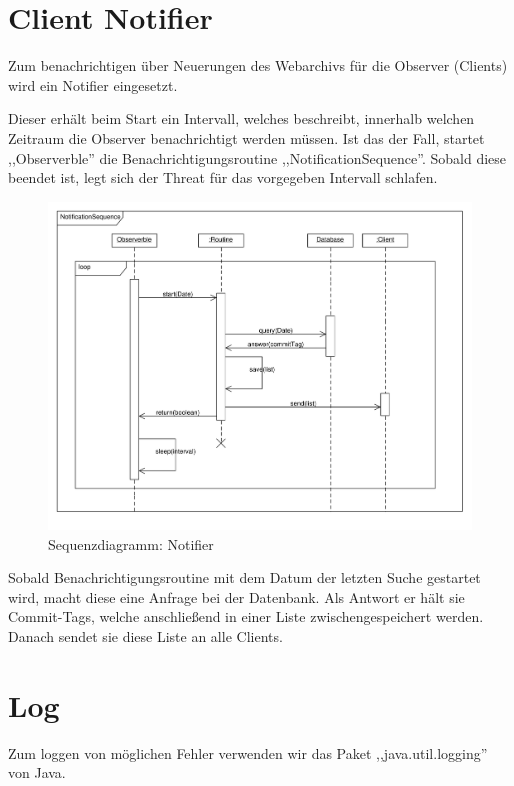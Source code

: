 \section {Client Notifier}
Zum benachrichtigen über Neuerungen des Webarchivs für die Observer (Clients) wird ein Notifier eingesetzt.

Dieser erhält beim Start ein Intervall, welches beschreibt, innerhalb welchen Zeitraum die Observer  benachrichtigt werden müssen. 
Ist das der Fall, startet ,,Observerble'' die Benachrichtigungsroutine  ,,NotificationSequence''.
Sobald diese beendet ist, legt sich der Threat  für das vorgegeben Intervall schlafen.

\begin{figure}[H]
	\centering
	\includegraphics[width=\textwidth]{design/frontend/sequence/notifySequence.pdf}
	\caption{Sequenzdiagramm: Notifier}
\end{figure}

Sobald Benachrichtigungsroutine mit dem Datum der letzten Suche gestartet wird, macht diese eine Anfrage bei der Datenbank. Als Antwort er hält sie Commit-Tags, welche anschließend in einer Liste zwischengespeichert werden. Danach sendet sie diese Liste an alle Clients. 

\section{Log}
Zum loggen von möglichen Fehler verwenden wir das Paket ,,java.util.logging'' von Java.


